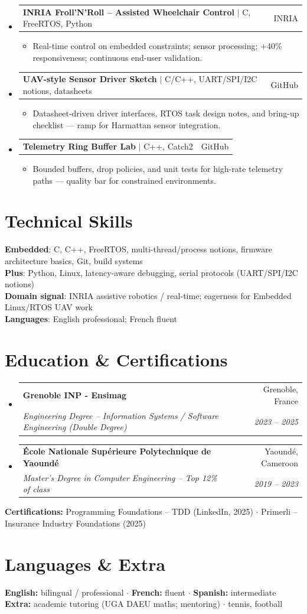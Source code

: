 \documentclass[letterpaper,10.5pt]{article}
\makeatletter
\newcommand{\resumeItem}[1]{\item\small{#1 \vspace{-1.5pt}}}
\newcommand{\resumeSubheading}[4]{
  \vspace{-1pt}\item
    \begin{tabular*}{0.97\textwidth}[t]{l@{\extracolsep{\fill}}r}
      \textbf{#1} & #2 \\
      \textit{\small#3} & \textit{\small #4} \\
    \end{tabular*}\vspace{-5pt}
}
\newcommand{\resumeProjectHeading}[2]{
    \item
    \begin{tabular*}{0.97\textwidth}{l@{\extracolsep{\fill}}r}
      \small#1 & #2 \\
    \end{tabular*}\vspace{-5pt}
}
\newcommand{\resumeSubHeadingListStart}{\begin{itemize}[leftmargin=0.15in, label={}]}
\newcommand{\resumeSubHeadingListEnd}{\end{itemize}}
\newcommand{\resumeItemListStart}{\begin{itemize}[leftmargin=0.18in]}
\newcommand{\resumeItemListEnd}{\end{itemize}\vspace{-3pt}}
\makeatother
\begin{document}
\resumeSubHeadingListStart

  \resumeProjectHeading
    {\textbf{INRIA Froll'N'Roll -- Assisted Wheelchair Control} $|$ C, FreeRTOS, Python}{INRIA}
    \resumeItemListStart
      \resumeItem{Real-time control on embedded constraints; sensor processing; +40\% responsiveness; continuous end-user validation.}
    \resumeItemListEnd
  \resumeProjectHeading
    {\textbf{UAV-style Sensor Driver Sketch} $|$ C/C++, UART/SPI/I2C notions, datasheets}{GitHub}
    \resumeItemListStart
      \resumeItem{Datasheet-driven driver interfaces, RTOS task design notes, and bring-up checklist --- ramp for Harmattan sensor integration.}
    \resumeItemListEnd
  \resumeProjectHeading
    {\textbf{Telemetry Ring Buffer Lab} $|$ C++, Catch2}{GitHub}
    \resumeItemListStart
      \resumeItem{Bounded buffers, drop policies, and unit tests for high-rate telemetry paths --- quality bar for constrained environments.}
    \resumeItemListEnd
\resumeSubHeadingListEnd

\section{Technical Skills}

\begin{itemize}[leftmargin=0.15in, label={}]
  \small{\item{
\textbf{Embedded}: C, C++, FreeRTOS, multi-thread/process notions, firmware architecture basics, Git, build systems \\
\textbf{Plus}: Python, Linux, latency-aware debugging, serial protocols (UART/SPI/I2C notions) \\
\textbf{Domain signal}: INRIA assistive robotics / real-time; eagerness for Embedded Linux/RTOS UAV work \\
\textbf{Languages}: English professional; French fluent
  }}
\end{itemize}

\section{Education \& Certifications}

\resumeSubHeadingListStart
  \resumeSubheading
    {Grenoble INP - Ensimag}{Grenoble, France}
    {Engineering Degree -- Information Systems / Software Engineering (Double Degree)}{2023 -- 2025}
  \resumeSubheading
    {\'Ecole Nationale Sup\'erieure Polytechnique de Yaound\'e}{Yaound\'e, Cameroon}
    {Master's Degree in Computer Engineering -- Top 12\% of class}{2019 -- 2023}
\resumeSubHeadingListEnd
\small{
\textbf{Certifications:} Programming Foundations -- TDD (LinkedIn, 2025) $\cdot$ Primerli -- Insurance Industry Foundations (2025)
}

\section{Languages \& Extra}
\small{
\textbf{English:} bilingual / professional $\cdot$ \textbf{French:} fluent $\cdot$ \textbf{Spanish:} intermediate \\
\textbf{Extra:} academic tutoring (UGA DAEU maths; mentoring) $\cdot$ tennis, football
}
\end{document}
